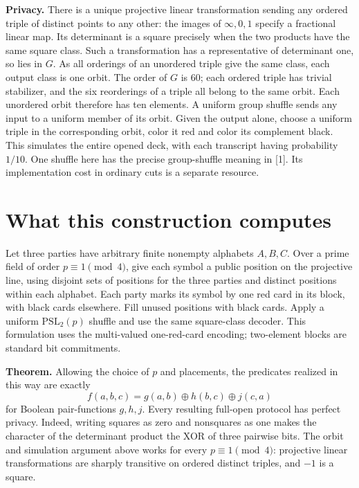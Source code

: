 \documentclass[11pt]{article}
\begin{document}
\textbf{Privacy.}
There is a unique projective linear transformation sending any ordered triple of distinct points to any other: the images of $\infty,0,1$ specify a fractional linear map. Its determinant is a square precisely when the two products have the same square class. Such a transformation has a representative of determinant one, so lies in $G$. As all orderings of an unordered triple give the same class, each output class is one orbit. The order of $G$ is $60$; each ordered triple has trivial stabilizer, and the six reorderings of a triple all belong to the same orbit. Each unordered orbit therefore has ten elements. A uniform group shuffle sends any input to a uniform member of its orbit. Given the output alone, choose a uniform triple in the corresponding orbit, color it red and color its complement black. This simulates the entire opened deck, with each transcript having probability $1/10$. One shuffle here has the precise group-shuffle meaning in [1]. Its implementation cost in ordinary cuts is a separate resource.

\section{What this construction computes}
Let three parties have arbitrary finite nonempty alphabets $A,B,C$. Over a prime field of order $p\equiv1\pmod4$, give each symbol a public position on the projective line, using disjoint sets of positions for the three parties and distinct positions within each alphabet. Each party marks its symbol by one red card in its block, with black cards elsewhere. Fill unused positions with black cards. Apply a uniform $\mathrm{PSL}_2(p)$ shuffle and use the same square-class decoder. This formulation uses the multi-valued one-red-card encoding; two-element blocks are standard bit commitments.

\textbf{Theorem.} Allowing the choice of $p$ and placements, the predicates realized in this way are exactly
\[
 f(a,b,c)=g(a,b)\oplus h(b,c)\oplus j(c,a)
\]
for Boolean pair-functions $g,h,j$. Every resulting full-open protocol has perfect privacy.
Indeed, writing squares as zero and nonsquares as one makes the character of the determinant product the XOR of three pairwise bits. The orbit and simulation argument above works for every $p\equiv1\pmod4$: projective linear transformations are sharply transitive on ordered distinct triples, and $-1$ is a square.
\end{document}
